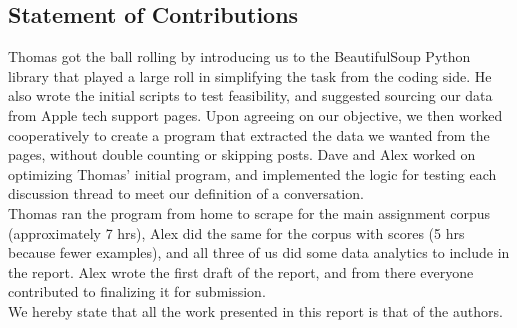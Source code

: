 \documentclass[10pt]{article}
\begin{document}
\begin{multicols}{2}

\section{Statement of Contributions}
Thomas got the ball rolling by introducing us to the BeautifulSoup Python library that played a large roll in simplifying the task from the coding side. He also wrote the initial scripts to test feasibility, and suggested sourcing our data from Apple tech support pages. Upon agreeing on our objective, we then worked cooperatively to create a program that extracted the data we wanted from the pages, without double counting or skipping posts. Dave and Alex worked on optimizing Thomas' initial program, and implemented the logic for testing each discussion thread to meet our definition of a conversation. \\

Thomas ran the program from home to scrape for the main assignment corpus (approximately 7 hrs), Alex did the same for the corpus with scores (5 hrs because fewer examples), and all three of us did some data analytics to include in the report. Alex wrote the first draft of the report, and from there everyone contributed to finalizing it for submission.\\

We hereby state that all the work presented in this report is that of the authors.




\end{multicols}
\end{document}
